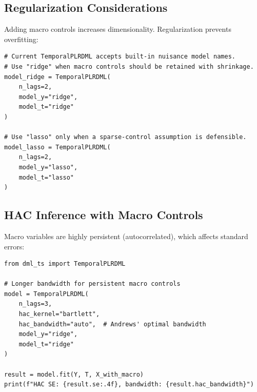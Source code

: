 \subsection{Regularization Considerations}

Adding macro controls increases dimensionality. Regularization prevents overfitting:

\begin{verbatim}
# Current TemporalPLRDML accepts built-in nuisance model names.
# Use "ridge" when macro controls should be retained with shrinkage.
model_ridge = TemporalPLRDML(
    n_lags=2,
    model_y="ridge",
    model_t="ridge"
)

# Use "lasso" only when a sparse-control assumption is defensible.
model_lasso = TemporalPLRDML(
    n_lags=2,
    model_y="lasso",
    model_t="lasso"
)
\end{verbatim}


\subsection{HAC Inference with Macro Controls}

Macro variables are highly persistent (autocorrelated), which affects standard errors:

\begin{verbatim}
from dml_ts import TemporalPLRDML

# Longer bandwidth for persistent macro controls
model = TemporalPLRDML(
    n_lags=3,
    hac_kernel="bartlett",
    hac_bandwidth="auto",  # Andrews' optimal bandwidth
    model_y="ridge",
    model_t="ridge"
)

result = model.fit(Y, T, X_with_macro)
print(f"HAC SE: {result.se:.4f}, bandwidth: {result.hac_bandwidth}")
\end{verbatim}

